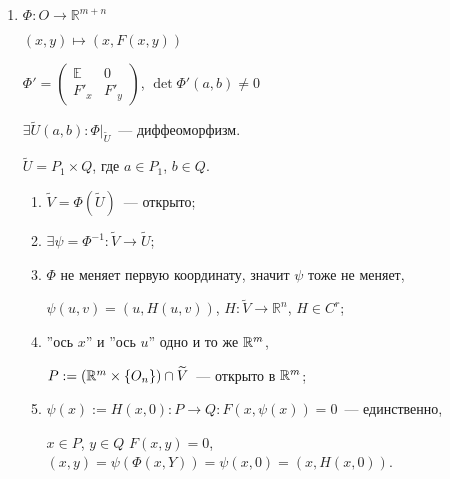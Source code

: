 \documentclass{article}
\begin{document}
            \begin{enumerate}
            
                \item $\Phi : O \rightarrow \mathbb{R}^{m + n}$
                
                    $(x, y) \mapsto \left( x, F(x, y) \right)$
                    
                    $\Phi' = \begin{pmatrix} \mathbb{E} & \mathrm{0} \\ F'_x & F'_y \end{pmatrix}$, $\det \Phi'(a, b) \neq 0$
                    
                    $\exists \widetilde{U}(a, b) : \Phi \big|_{\widetilde{U}}$~--- диффеоморфизм.
                    
                    $\widetilde{U} = P_1 \times Q$, где $a \in P_1$, $b \in Q$.
                    
                    \begin{enumerate}
                    
                        \item $\widetilde{V} = \Phi \left( \widetilde{U} \right)$~--- открыто;
                        
                        \item $\exists \psi = \Phi^{-1} : \widetilde{V} \rightarrow \widetilde{U}$;
                        
                        \item $\Phi$ не меняет первую координату, значит $\psi$ тоже не меняет,
                        
                            $\psi(u, v) = (u, H(u, v) )$, $H : \widetilde{V} \rightarrow \mathbb{R}^n$, $H \in C^r$;
                            
                        \item ''ось $x$'' и ''ось $u$'' одно и то же $\mathbb{R}^m$,
                        
                            $P := \left( \mathbb{R}^m \times \left\{ O_n \right\} \right) \cap \widetilde{V}$~--- открыто в $\mathbb{R}^m$;
                            
                        \item $\psi (x) := H(x, 0) : P \rightarrow Q : F(x, \psi(x) ) = 0$~--- единственно,
                        
                            $x \in P$, $y \in Q$ $F(x, y) = 0$, $(x, y) = \psi \left( \Phi (x, Y) \right) = \psi(x, 0) = (x, H(x, 0))$.
                            

\end{enumerate}
\end{enumerate}
\end{document}
